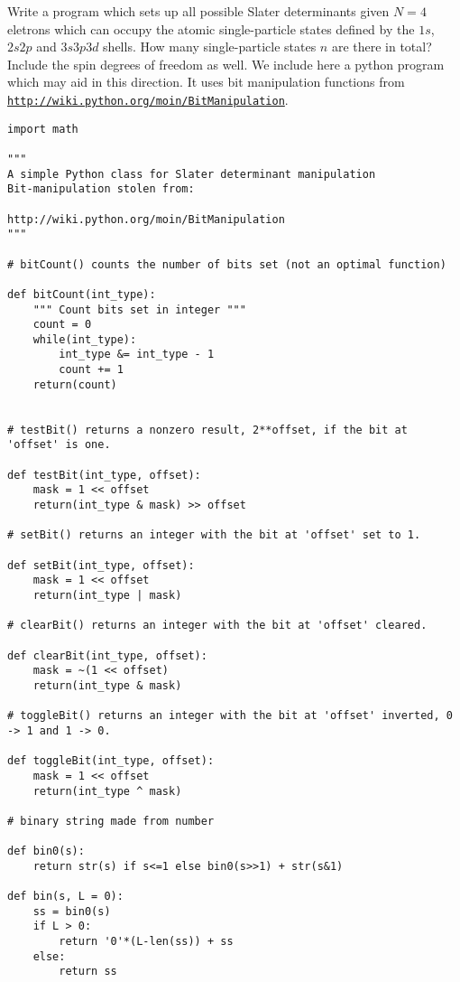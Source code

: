 \documentclass[%
twoside,                 %
final,                   %
10pt]{article}
\begin{document}
Write a program which sets up all possible Slater determinants given $N=4$ eletrons which can occupy
the atomic single-particle states defined by the $1s$, $2s2p$ and $3s3p3d$ shells. How many single-particle
states $n$ are there in total?  Include the spin degrees of freedom as well.
We include here a python program which may aid in this direction. It uses bit manipulation functions from \href{{http://wiki.python.org/moin/BitManipulation}}{\nolinkurl{http://wiki.python.org/moin/BitManipulation}}.
\begin{verbatim}
import math

"""
A simple Python class for Slater determinant manipulation
Bit-manipulation stolen from:

http://wiki.python.org/moin/BitManipulation
"""

# bitCount() counts the number of bits set (not an optimal function)

def bitCount(int_type):
    """ Count bits set in integer """
    count = 0
    while(int_type):
        int_type &= int_type - 1
        count += 1
    return(count)


# testBit() returns a nonzero result, 2**offset, if the bit at 'offset' is one.

def testBit(int_type, offset):
    mask = 1 << offset
    return(int_type & mask) >> offset

# setBit() returns an integer with the bit at 'offset' set to 1.

def setBit(int_type, offset):
    mask = 1 << offset
    return(int_type | mask)

# clearBit() returns an integer with the bit at 'offset' cleared.

def clearBit(int_type, offset):
    mask = ~(1 << offset)
    return(int_type & mask)

# toggleBit() returns an integer with the bit at 'offset' inverted, 0 -> 1 and 1 -> 0.

def toggleBit(int_type, offset):
    mask = 1 << offset
    return(int_type ^ mask)

# binary string made from number

def bin0(s):
    return str(s) if s<=1 else bin0(s>>1) + str(s&1)

def bin(s, L = 0):
    ss = bin0(s)
    if L > 0:
        return '0'*(L-len(ss)) + ss
    else:
        return ss
    
    


\end{verbatim}
\end{document}
